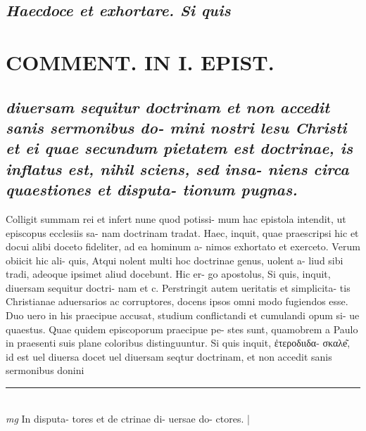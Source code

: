 \documentclass{article}
\begin{document}
\begin{pages}
\subsection*{\textit{Haecdoce et exhortare. Si quis }}
\section*{COMMENT. IN I. EPIST. }
{}
\subsection*{\textit{diuersam sequitur doctrinam et non accedit sanis sermonibus do- mini nostri lesu Christi et ei quae secundum pietatem est doctrinae, is inflatus est, nihil sciens, sed insa- niens circa quaestiones et disputa- tionum pugnas. }}\pstart Colligit summam rei et infert nune quod potissi- mum hac epistola intendit, ut episcopus ecclesiis sa- nam doctrinam tradat. Haec, inquit, quae praescripsi hic et docui alibi doceto fideliter, ad ea hominum a- nimos exhortato et exerceto. Verum obiicit hic ali- quis, Atqui nolent multi hoc doctrinae genus, uolent a- liud sibi tradi, adeoque ipsimet aliud docebunt. Hic er- go apostolus, Si quis, inquit, diuersam sequitur doctri- nam et c. Perstringit autem ueritatis et simplicita- tis Christianae aduersarios ac corruptores, docens ipsos omni modo fugiendos esse. Duo uero in his praecipue accusat, studium conflictandi et cumulandi opum si- ue quaestus. Quae quidem episcoporum praecipue pe- stes sunt, quamobrem a Paulo in praesenti suis plane coloribus distinguuntur. Si quis inquit, ἐτεροδιιδα- σκαλe͂, id est uel diuersa docet uel diuersam seqtur doctrinam, et non accedit sanis sermonibus donini  \pend
\vspace{0.5cm}\noindent
\vspace{0.2cm}\rule{1cm}{0.2pt}\\ 
\hspace{0.2cm}\textit{mg}
\footnotesize In disputa- tores et de ctrinae di- uersae do- ctores. 
\normalsize| 

\end{pages}
\end{document}
